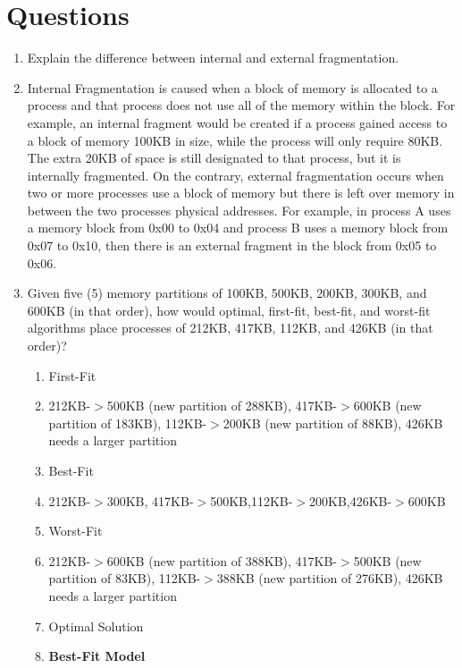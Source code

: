 \section{Questions}
    \begin{enumerate}
        \item Explain the difference between internal and external fragmentation.
        \item[] Internal Fragmentation is caused when a block of memory is allocated to a process and that process does not use all of the memory within the block. For example, an internal fragment would be created if a process gained access to a block of memory 100KB in size, while the process will only require 80KB. The extra 20KB of space is still designated to that process, but it is internally fragmented. On the contrary, external fragmentation occurs when two or more processes use a block of memory but there is left over memory in between the two processes physical addresses. For example, in process A uses a memory block from 0x00 to 0x04 and process B uses a memory block from 0x07 to 0x10, then there is an external fragment in the block from 0x05 to 0x06.
        \item Given five (5) memory partitions of 100KB, 500KB, 200KB, 300KB, and 600KB (in that order), how would optimal, first-fit, best-fit, and worst-fit algorithms place processes of 212KB, 417KB, 112KB, and 426KB (in that order)?
        \begin{enumerate}
            \item First-Fit
            \item[] 212KB-$>$500KB (new partition of 288KB), 417KB-$>$600KB (new partition of 183KB), 112KB-$>$200KB (new partition of 88KB), 426KB needs a larger partition
            \item Best-Fit
            \item[] 212KB-$>$300KB, 417KB-$>$500KB,112KB-$>$200KB,426KB-$>$600KB
            \item Worst-Fit
            \item[] 212KB-$>$600KB (new partition of 388KB), 417KB-$>$500KB (new partition of 83KB), 112KB-$>$388KB (new partition of 276KB), 426KB needs a larger partition 
            \item Optimal Solution
            \item[] \textbf{Best-Fit Model}
        \end{enumerate}
    \end{enumerate}

